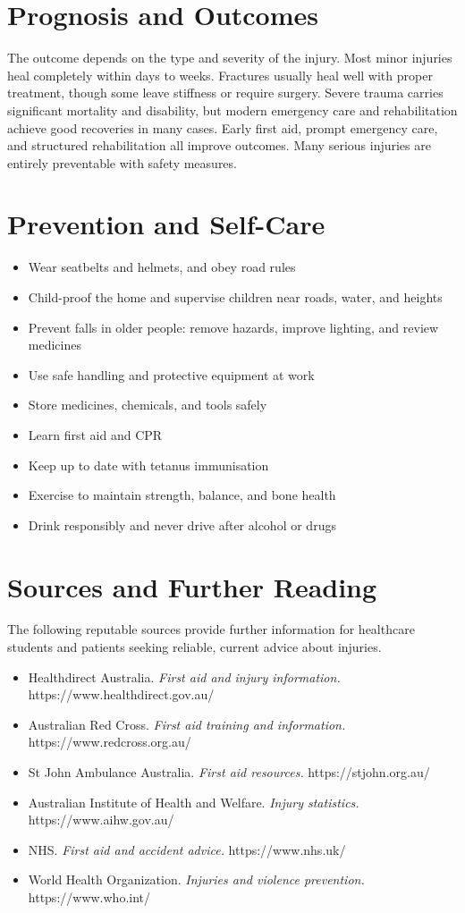 \section*{Prognosis and Outcomes}
The outcome depends on the type and severity of the injury. Most minor injuries heal completely within days to weeks. Fractures usually heal well with proper treatment, though some leave stiffness or require surgery. Severe trauma carries significant mortality and disability, but modern emergency care and rehabilitation achieve good recoveries in many cases. Early first aid, prompt emergency care, and structured rehabilitation all improve outcomes. Many serious injuries are entirely preventable with safety measures.

\section*{Prevention and Self-Care}
\begin{itemize}
    \item Wear seatbelts and helmets, and obey road rules
    \item Child-proof the home and supervise children near roads, water, and heights
    \item Prevent falls in older people: remove hazards, improve lighting, and review medicines
    \item Use safe handling and protective equipment at work
    \item Store medicines, chemicals, and tools safely
    \item Learn first aid and CPR
    \item Keep up to date with tetanus immunisation
    \item Exercise to maintain strength, balance, and bone health
    \item Drink responsibly and never drive after alcohol or drugs
\end{itemize}

\section*{Sources and Further Reading}
The following reputable sources provide further information for healthcare students and patients seeking reliable, current advice about injuries.
\begin{itemize}
    \item Healthdirect Australia. \textit{First aid and injury information.} https://www.healthdirect.gov.au/
    \item Australian Red Cross. \textit{First aid training and information.} https://www.redcross.org.au/
    \item St John Ambulance Australia. \textit{First aid resources.} https://stjohn.org.au/
    \item Australian Institute of Health and Welfare. \textit{Injury statistics.} https://www.aihw.gov.au/
    \item NHS. \textit{First aid and accident advice.} https://www.nhs.uk/
    \item World Health Organization. \textit{Injuries and violence prevention.} https://www.who.int/
\end{itemize}

